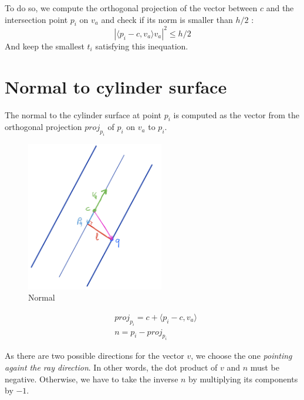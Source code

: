 \documentclass{article}
\begin{document}
To do so, we compute the orthogonal projection of the vector between $c$ and the intersection point $p_i$ on $v_a$ and check if its norm is smaller than $h/2$ :
$$|\langle p_i-c, v_a\rangle v_a|^2 \leq h/2$$
And keep the smallest $t_i$ satisfying this inequation.

\section{Normal to cylinder surface}

The normal to the cylinder surface at point $p_i$ is computed as the vector from the orthogonal projection $proj_{p_i}$ of $p_i$ on $v_a$ to $p_i$.

\begin{figure}[h]
\centering
\includegraphics[width=6cm]{res/Cylinder_sketch.jpeg}
\caption{Normal}
\end{figure}


\begin{align*}
    &proj_{p_i} = c + \langle p_i-c, v_a \rangle \\
    &n = p_i - proj_{p_i}
\end{align*}

As there are two possible directions for the vector $v$, we choose the one \textit{pointing againt the ray direction}. In other words, the dot product of $v$ and $n$ must be negative. Otherwise, we have to take the inverse $n$ by multiplying its components by $-1$.
\end{document}
